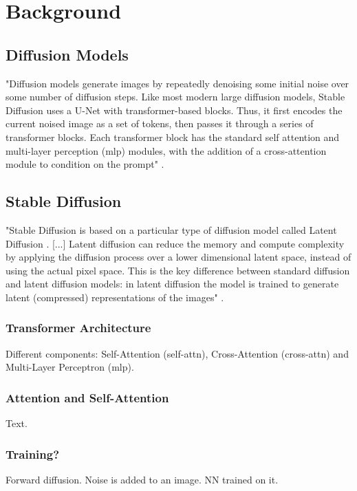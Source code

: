 \section{Background}



\subsection{Diffusion Models}
"Diffusion models \cite{dhariwal2021diffusion, sohl2015deep, song2019generative} generate images by repeatedly denoising some initial noise over some number of diffusion steps. Like most modern large diffusion models, Stable Diffusion uses a U-Net \cite{ronneberger2015u} with transformer-based blocks. Thus, it first encodes the current noised image as a set of tokens, then passes it through a series of transformer blocks. Each transformer block has the standard self attention \cite{vaswani2017attention} and multi-layer perception (mlp) modules, with the addition of a cross-attention module to condition on the prompt" \cite{bolya2023tomesd}.

\subsection{Stable Diffusion}
"Stable Diffusion is based on a particular type of diffusion model called Latent Diffusion \cite{Rombach_2022_CVPR}. [...] Latent diffusion can reduce the memory and compute complexity by applying the diffusion process over a lower dimensional latent space, instead of using the actual pixel space. This is the key difference between standard diffusion and latent diffusion models: in latent diffusion the model is trained to generate latent (compressed) representations of the images" \cite{patil2022stable}.


\subsubsection{Transformer Architecture}
Different components: Self-Attention (self-attn), Cross-Attention (cross-attn) and Multi-Layer Perceptron (mlp).



\subsubsection{Attention and Self-Attention}
Text.



\subsubsection{Training?}
Forward diffusion. Noise is added to an image. NN trained on it.



